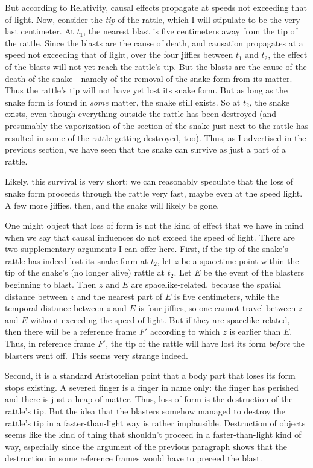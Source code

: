 But according to Relativity, causal effects propagate at speeds not exceeding that of light. Now, consider the \textit{tip}
of the rattle, which I will stipulate to be the very last centimeter. At $t_1$, the nearest blast is five centimeters away from 
the tip of the rattle. Since the blasts are the cause of death, and causation propagates at a speed not exceeding that of light,
over the four jiffies between $t_1$ and $t_2$, the effect of the blasts will not yet reach the rattle's tip. But the blasts are 
the cause of the death of the snake---namely of the removal of the snake form from its matter. Thus the rattle's tip will not 
have yet lost its snake form. But as long as the snake form is found in \textit{some} matter, the snake still exists. So 
at $t_2$, the snake exists, even though everything outside the rattle has been destroyed (and presumably the vaporization of 
the section of the snake just next to the rattle has resulted in some of the rattle getting destroyed, too). Thus, as I advertised 
in the previous section, we have seen that the snake can survive as just a part of a rattle.

Likely, this survival is very short: we can reasonably speculate that the loss of snake form proceeds through the rattle 
very fast, maybe even at the speed light. A few more jiffies, then, and the snake will likely be gone.

One might object that loss of form is not the kind of effect that we have in mind when we say that causal influences do not 
exceed the speed of light. There are two supplementary arguments I can offer here. First, if the tip of the snake's rattle 
has indeed lost its snake form at $t_2$, let $z$ be a spacetime point within the tip of the snake's (no longer alive) rattle 
at $t_2$. Let $E$ be the event of the blasters beginning to blast. Then $z$ and $E$ are spacelike-related, because the spatial 
distance between $z$ and the nearest part of $E$ is five centimeters, while the temporal distance between $z$ and $E$ is four
jiffies, so one cannot travel between $z$ and $E$ without exceeding the speed of light. But if they are spacelike-related, then
there will be a reference frame $F'$ according to which $z$ is earlier than $E$. Thus, in reference frame $F'$, the tip of the 
rattle will have lost its form \textit{before} the blasters went off. This seems very strange indeed.

Second, it is a standard Aristotelian point that a body part that loses its form stops existing. A severed finger is a 
finger in name only: the finger has perished and there is just a heap of matter. Thus, loss of form is the destruction 
of the rattle's tip. But the idea that the blasters somehow managed to destroy the rattle's tip in a faster-than-light 
way is rather implausible. Destruction of objects seems like the kind of thing that shouldn't proceed in a faster-than-light
kind of way, especially since the argument of the previous paragraph shows that the destruction in some reference frames 
would have to preceed the blast. 

